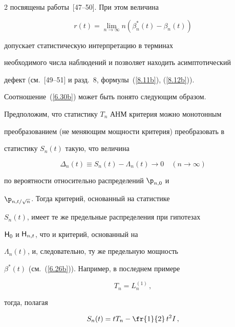 \begin{multicols}{2}
посвящены работы~[47--50]. При этом величина


\begin{equation}


r(t) = \lim_{n\to\infty} n(\beta_n^*(t) - \beta_n(t))


\label{6.31b}


\end{equation}


допускает статистическую интерпретацию в терминах


необходимого числа наблюдений и позволяет находить асимптотический


дефект (см.~[49--51] и разд.~8, формулы~(\ref{8.11b}), (\ref{8.12b})).





Соотношение~(\ref{6.30b}) может быть понято следующим образом.


Предположим, что статистику $T_n$ АНМ критерия можно монотонным


преобразованием (не меняющим мощности критерия) преобразовать в


статистику $S_n(t)$ такую, что величина


\begin{equation}


\Delta_n(t) \equiv S_n(t) - \Lambda_n(t) \to 0\quad


(n\to\infty) \label{6.32b}


\end{equation}


по вероятности относительно распределений ${\p}_{n,0}$ и


${\p}_{n,t/\sqrt{n}}$. Тогда критерий, основанный на статистике


$S_n(t)$, имеет те же предельные распределения при гипотезах


${\sf H}_0$ и ${\sf H}_{n,t}$, что и критерий, основанный на


$\Lambda_n(t)$, и, следовательно, ту же предельную мощность


$\beta^*(t)$ (см.~(\ref{6.26b})). Например, в последнем примере


$$


T_n = L_n^{(1)}\,,


$$


тогда, полагая 


$$


S_n(t) =


tT_n - \fr{1}{2}\,t^2I\,,


$$



\end{multicols}
